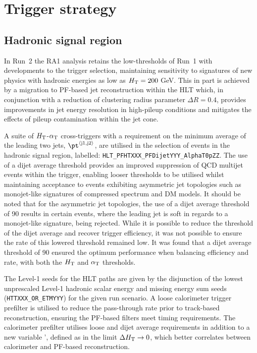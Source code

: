 \section{Trigger strategy}
\label{sec:triggers}


\subsection{Hadronic signal region\label{sec:hadronic_signal_region}}

In Run~2 the RA1 analysis retains the low-thresholds of Run~1 with developments 
to the trigger selection, maintaining sensitivity to signatures of new physics with hadronic 
energies as low as $\mbox{$H_\text{T}$} = 200$ GeV. This in part is achieved by a migration to PF-based 
jet reconstruction within the HLT which, in conjunction with a reduction of clustering radius 
parameter $\Delta R = 0.4$, provides improvements in jet energy resolution in high-pileup 
conditions and mitigates the effects of pileup contamination within the jet cone.

A suite of $\mbox{$H_\text{T}$}$-$\alpha_{\text{T}}$ cross-triggers with a requirement on the minimum average \pt of 
the leading two jets, $\pt^{\rm \left<j1,j2\right>}$, are utilised in the selection of events in 
the hadronic signal region, labelled: \verb!HLT_PFHTXXX_PFDijetYYY_AlphaT0pZZ!. The use of a 
dijet average threshold provides an improved suppression of QCD multijet events within the trigger,
enabling looser \alphat thresholds to be utilised whilst maintaining acceptance to events exhibiting asymmetric jet 
topologies such as monojet-like signatures of compressed spectrum and DM models. 
It should be noted that for the asymmetric jet topologies, the use of a dijet average threshold of 90 \GeV
results in certain events, where the leading jet \pt is soft in regards to a monojet-like signature, being
rejected. While it is possible to reduce the threshold of the dijet average and recover trigger efficiency,
it was not possible to ensure the rate of this lowered threshold remained low. It was found that a dijet average
threshold of 90 \GeV ensured the optimum performance when balancing efficiency and rate, with both the $\mbox{$H_\text{T}$}$ and $\alpha_{\text{T}}$
thresholds. 

The Level-1 seeds for the HLT paths are given by the disjunction of the lowest 
unprescaled Level-1 hadronic scalar energy and missing energy sum seeds (\verb!HTTXXX_OR_ETMYYY!) for 
the given run scenario. A loose calorimeter trigger prefilter is utilised to reduce the pass-through 
rate prior to track-based reconstruction, ensuring the PF-based filters meet timing requirements. The calorimeter prefilter 
utilises loose \scalht and dijet average \pt requirements in addition to a new variable \alphat', 
defined as \alphat in the limit $\Delta\mbox{$H_\text{T}$} \rightarrow 0$, which better correlates \alphat 
between calorimeter and PF-based reconstruction.

